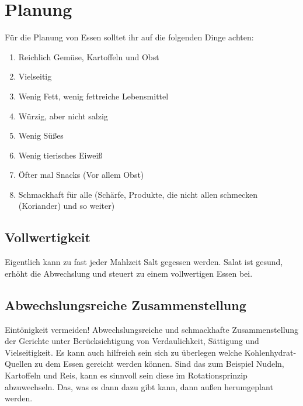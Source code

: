 \section{Planung}\label{sec:planung}

Für die Planung von Essen solltet ihr auf die folgenden Dinge achten:
\begin{enumerate}
    \item Reichlich Gemüse, Kartoffeln und Obst
    \item Vielseitig
    \item Wenig Fett, wenig fettreiche Lebensmittel
    \item Würzig, aber nicht salzig
    \item Wenig Süßes
    \item Wenig tierisches Eiweiß
    \item Öfter mal Snacks (Vor allem Obst)
    \item Schmackhaft für alle (Schärfe, Produkte, die nicht allen schmecken (Koriander) und so weiter)
\end{enumerate}

\subsection{Vollwertigkeit}\label{subsec:vollwertigkeit}
Eigentlich kann zu fast jeder Mahlzeit Salt gegessen werden.
Salat ist gesund, erhöht die Abwechslung und steuert zu einem vollwertigen Essen bei.

\subsection{Abwechslungsreiche Zusammenstellung}\label{subsec:abwechslungsreiche-zusammenstellung}
Eintönigkeit vermeiden!
Abwechslungsreiche und schmackhafte Zusammenstellung der Gerichte unter Berücksichtigung von Verdaulichkeit, Sättigung und Vielseitigkeit.
Es kann auch hilfreich sein sich zu überlegen welche Kohlenhydrat-Quellen zu dem Essen gereicht werden können.
Sind das zum Beispiel Nudeln, Kartoffeln und Reis, kann es sinnvoll sein diese im Rotationsprinzip abzuwechseln.
Das, was es dann \glqq dazu \grqq{} gibt kann, dann außen herumgeplant werden.

